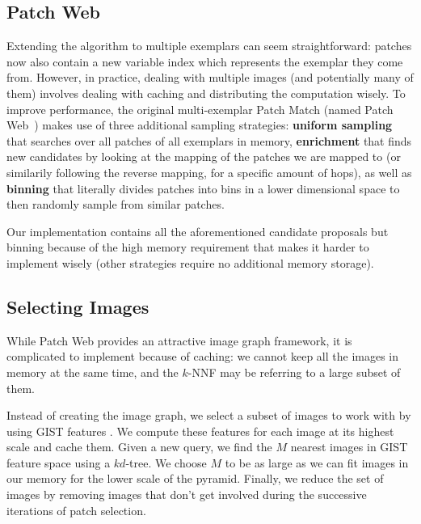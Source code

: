 
\subsection{Patch Web}
Extending the algorithm to multiple exemplars can seem straightforward: patches now also contain a new variable index which represents the exemplar they come from.
However, in practice, dealing with multiple images (and potentially many of them) involves dealing with caching and distributing the computation wisely.
To improve performance, the original multi-exemplar Patch Match (named Patch Web~\cite{Barnes11}) makes use of three additional sampling strategies:
\textbf{uniform sampling} that searches over all patches of all exemplars in memory,
\textbf{enrichment} that finds new candidates by looking at the mapping of the patches we are mapped to (or similarily following the reverse mapping, for a specific amount of hops), as well as
\textbf{binning} that literally divides patches into bins in a lower dimensional space to then randomly sample from similar patches.

Our implementation contains all the aforementioned candidate proposals but binning because of the high memory requirement that makes it harder to implement wisely (other strategies require no additional memory storage).

\subsection{Selecting Images}
While Patch Web provides an attractive image graph framework, it is complicated to implement because of caching: we cannot keep all the images in memory at the same time, and the $k$-NNF may be referring to a large subset of them.

Instead of creating the image graph, we select a subset of images to work with by using GIST features \cite{Torralba08b}.
We compute these features for each image at its highest scale and cache them.
Given a new query, we find the $M$ nearest images in GIST feature space using a $kd$-tree.
We choose $M$ to be as large as we can fit images in our memory for the lower scale of the pyramid.
Finally, we reduce the set of images by removing images that don't get involved during the successive iterations of patch selection.